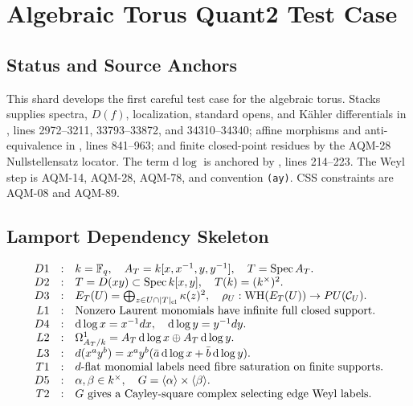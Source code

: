 
\section{Algebraic Torus Quant2 Test Case}
\label{sec:algebraic-torus-quant2}

\subsection{Status and Source Anchors}

This shard develops the first careful test case for the algebraic torus.
Stacks supplies spectra, \(D(f)\), localization, standard opens, and Kähler
differentials in ,
lines 2972--3211, 33793--33872, and 34310--34340; affine morphisms and
anti-equivalence in ,
lines 841--963; and finite closed-point residues by the AQM-28
Nullstellensatz locator.  The term \(\mathrm d\log\) is anchored by
, lines 214--223.
The Weyl step is AQM-14, AQM-28, AQM-78, and convention \texttt{(ay)}.  CSS
constraints are AQM-08 and AQM-89.

\subsection{Lamport Dependency Skeleton}
\[
\begin{array}{rcl}
D1&:&k=\mathbb F_q,\quad A_T=k[x,x^{-1},y,y^{-1}],\quad T=\operatorname{Spec} A_T.\\
D2&:&T=D(xy)\subset\operatorname{Spec} k[x,y],\quad T(k)=(k^\times)^2.\\
D3&:&E_T(U)=\bigoplus_{z\in U\cap |T|_{\rm cl}}\kappa(z)^2,\quad
      \rho_U:\operatorname{WH}(E_T(U))\to PU(\mathcal C_U).\\
L1&:&\text{Nonzero Laurent monomials have infinite full closed support.}\\
D4&:&\mathrm d\log x=x^{-1}dx,\quad \mathrm d\log y=y^{-1}dy.\\
L2&:&\Omega^1_{A_T/k}=A_T\,\mathrm d\log x\oplus A_T\,\mathrm d\log y.\\
L3&:&d(x^ay^b)=x^ay^b(\bar a\,\mathrm d\log x+\bar b\,\mathrm d\log y).\\
T1&:&d\text{-flat monomial labels need fibre saturation on finite supports.}\\
D5&:&\alpha,\beta\in k^\times,\quad G=\langle\alpha\rangle\times\langle\beta\rangle.\\
T2&:&G\text{ gives a Cayley-square complex selecting edge Weyl labels.}
\end{array}
\]

